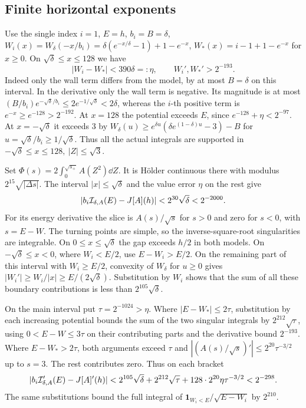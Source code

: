 \subsection{Finite horizontal exponents}
Use the single index \(i=1\), \(E=h\), \(b_i=B=\delta\), \(W_i(x)=W_\delta(-x/b_i)=\delta(e^{-x/\delta}-1)+1-e^{-x}\),
\(W_*(x)=i-1+1-e^{-x}\) for \(x\ge0\).
On \(\sqrt\delta\le x\le128\) we have
\[
 |W_i-W_*|<390\delta=:\eta,\qquad W_i',W_*'>2^{-193}.
\]
Indeed only the wall term differs from the model, by at most \(B=\delta\) on this interval. In the derivative only the wall term is negative.
Its magnitude is at most
\((B/b_i)e^{-\sqrt\delta/b_i}\le2e^{-1/\sqrt\delta}<2\delta\),
whereas the \(i\)-th positive term is \(e^{-x}\ge e^{-128}>2^{-192}\).
At \(x=128\) the potential exceeds \(E\), since \(e^{-128}+\eta<2^{-97}\).
At \(x=-\sqrt\delta\) it exceeds 3 by
\(W_\delta(u)\ge e^{\delta u}(\delta e^{(1-\delta)u}-3)-B\) for
\(u=\sqrt\delta/b_i\ge1/\sqrt\delta\).
Thus all the actual integrals are supported in
\(-\sqrt\delta\le x\le128,\ |Z|\le\sqrt3\).

Set \(\Phi(s)=2\int_0^{\sqrt{s_+}} A(Z^2)\dd Z\).
It is Hölder continuous there with modulus \(2^{15}\sqrt{|\Delta s|}\).
The interval \(|x|\le\sqrt\delta\) and the value error \(\eta\) on the
rest give
\[
 |b_i{\cal I}_{\delta,A}(E)-J[A](h)|<2^{30}\sqrt\delta<2^{-2000}.
\]
For its energy derivative the slice is \(A(s)/\sqrt s\) for \(s>0\)
and zero for \(s<0\), with \(s=E-W\). The turning points are simple, so
the inverse-square-root singularities are integrable.
On \(0\le x\le\sqrt\delta\) the gap exceeds \(h/2\) in both models.
On \(-\sqrt\delta\le x<0\), where \(W_i<E/2\), use \(E-W_i>E/2\).
On the remaining part of this interval with \(W_i\ge E/2\), convexity
of \(W_\delta\) for \(u\ge0\) gives \(|W_i'|\ge W_i/|x|\ge
E/(2\sqrt\delta)\). Substitution by \(W_i\) shows that the sum of all
these boundary contributions is less than \(2^{105}\sqrt\delta\).

On the main interval put \(\tau=2^{-1024}>\eta\).
Where \(|E-W_*|\le2\tau\), substitution by each increasing potential
bounds the sum of the two singular integrals by
\(2^{212}\sqrt\tau\), using \(0<E-W\le3\tau\) on their contributing
parts and the derivative bound \(2^{-193}\). Where \(E-W_*>2\tau\),
both arguments exceed \(\tau\) and
\(|(A(s)/\sqrt s)'|\le2^{20}\tau^{-3/2}\) up to \(s=3\).
The rest contributes zero. Thus on each bracket
\begin{equation}
 |b_i{\cal I}'_{\delta,A}(E)-J[A]'(h)|
 <2^{105}\sqrt\delta+2^{212}\sqrt\tau+128\cdot2^{20}\eta\tau^{-3/2}
 <2^{-298}.                                                        \label{six:deltaestimate}
\end{equation}
The same substitutions bound the full integral of
\(\mathbf1_{W_i<E}/\sqrt{E-W_i}\) by \(2^{210}\).

